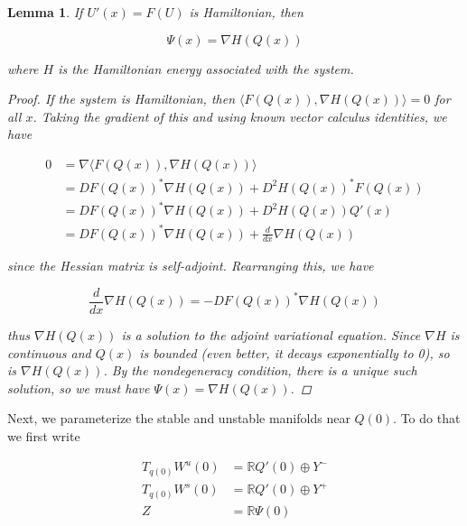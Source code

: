 \documentclass[12pt]{article}
\def\R{{\mathbb R}}
\newtheorem{lemma}{Lemma}
\begin{document}

\begin{lemma}

If $U'(x) = F(U)$ is Hamiltonian, then

\begin{equation}
\Psi(x) = \nabla H(Q(x))
\end{equation}

where $H$ is the Hamiltonian energy associated with the system.

\begin{proof}

If the system is Hamiltonian, then $\langle F(Q(x)), \nabla H(Q(x)) \rangle = 0$ for all $x$. Taking the gradient of this and using known vector calculus identities, we have

\begin{align*}
0 &= \nabla \langle F(Q(x)), \nabla H(Q(x)) \rangle \\
&= D F(Q(x))^* \nabla H(Q(x)) + D^2 H(Q(x))^* F(Q(x)) \\
&= D F(Q(x))^* \nabla H(Q(x)) + D^2 H(Q(x)) Q'(x) \\
&= D F(Q(x))^* \nabla H(Q(x)) + \frac{d}{dx} \nabla H(Q(x))
\end{align*}

since the Hessian matrix is self-adjoint. Rearranging this, we have

\begin{equation}
\frac{d}{dx} \nabla H(Q(x)) = -D F(Q(x))^* \nabla H(Q(x)) 
\end{equation}

thus $\nabla H(Q(x))$ is a solution to the adjoint variational equation. Since $\nabla H$ is continuous and $Q(x)$ is bounded (even better, it decays exponentially to 0), so is $\nabla H(Q(x))$. By the nondegeneracy condition, there is a unique such solution, so we must have $\Psi(x) = \nabla H(Q(x))$.

\end{proof}
\end{lemma}

Next, we parameterize the stable and unstable manifolds near $Q(0)$. To do that we first write

\begin{align*}
T_{q(0)}W^u(0) &= \R Q'(0) \oplus Y^- \\
T_{q(0)}W^s(0) &= \R Q'(0) \oplus Y^+ \\
Z &= \R \Psi(0)
\end{align*}
\end{document}
